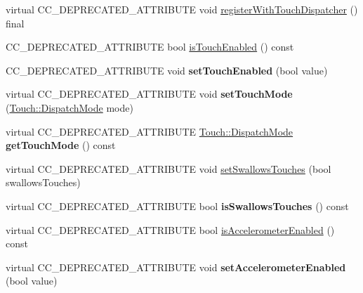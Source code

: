 \begin{DoxyCompactItemize}
\item 
virtual C\+C\+\_\+\+D\+E\+P\+R\+E\+C\+A\+T\+E\+D\+\_\+\+A\+T\+T\+R\+I\+B\+U\+TE void \hyperlink{classLayer_a988787d86ff8b8f1d0d75dcc6c2c181b}{register\+With\+Touch\+Dispatcher} () final
\item 
C\+C\+\_\+\+D\+E\+P\+R\+E\+C\+A\+T\+E\+D\+\_\+\+A\+T\+T\+R\+I\+B\+U\+TE bool \hyperlink{classLayer_a4a76db13ede97c17f458a93d4b14c183}{is\+Touch\+Enabled} () const
\item 
\mbox{\label{classLayer_a14c3b32403c950de6b53bde76306524d}} 
C\+C\+\_\+\+D\+E\+P\+R\+E\+C\+A\+T\+E\+D\+\_\+\+A\+T\+T\+R\+I\+B\+U\+TE void {\bfseries set\+Touch\+Enabled} (bool value)
\item 
\mbox{\label{classLayer_aa55d4b1313bd4592dbc371ced4ef8ee1}} 
virtual C\+C\+\_\+\+D\+E\+P\+R\+E\+C\+A\+T\+E\+D\+\_\+\+A\+T\+T\+R\+I\+B\+U\+TE void {\bfseries set\+Touch\+Mode} (\hyperlink{classTouch_a3970fe1342ce78786781e8383164983d}{Touch\+::\+Dispatch\+Mode} mode)
\item 
\mbox{\label{classLayer_afcc9b1d05e5e718192b1181210f95753}} 
virtual C\+C\+\_\+\+D\+E\+P\+R\+E\+C\+A\+T\+E\+D\+\_\+\+A\+T\+T\+R\+I\+B\+U\+TE \hyperlink{classTouch_a3970fe1342ce78786781e8383164983d}{Touch\+::\+Dispatch\+Mode} {\bfseries get\+Touch\+Mode} () const
\item 
virtual C\+C\+\_\+\+D\+E\+P\+R\+E\+C\+A\+T\+E\+D\+\_\+\+A\+T\+T\+R\+I\+B\+U\+TE void \hyperlink{classLayer_a5f501802738f5f497da4dbf64a1a75e1}{set\+Swallows\+Touches} (bool swallows\+Touches)
\item 
\mbox{\label{classLayer_a7ce1ba2d184742baaab24ee93dcedd7a}} 
virtual C\+C\+\_\+\+D\+E\+P\+R\+E\+C\+A\+T\+E\+D\+\_\+\+A\+T\+T\+R\+I\+B\+U\+TE bool {\bfseries is\+Swallows\+Touches} () const
\item 
virtual C\+C\+\_\+\+D\+E\+P\+R\+E\+C\+A\+T\+E\+D\+\_\+\+A\+T\+T\+R\+I\+B\+U\+TE bool \hyperlink{classLayer_af95bbd9e4e412e8f1d3a28c9dc9a7ce2}{is\+Accelerometer\+Enabled} () const
\item 
\mbox{\label{classLayer_a9983e72319eccef2929c0006fcd1a0fc}} 
virtual C\+C\+\_\+\+D\+E\+P\+R\+E\+C\+A\+T\+E\+D\+\_\+\+A\+T\+T\+R\+I\+B\+U\+TE void {\bfseries set\+Accelerometer\+Enabled} (bool value)
\item 
\mbox{\label{classLayer_a19ab821e80fde021ac969678ada8ca95}} 

\end{DoxyCompactItemize}
